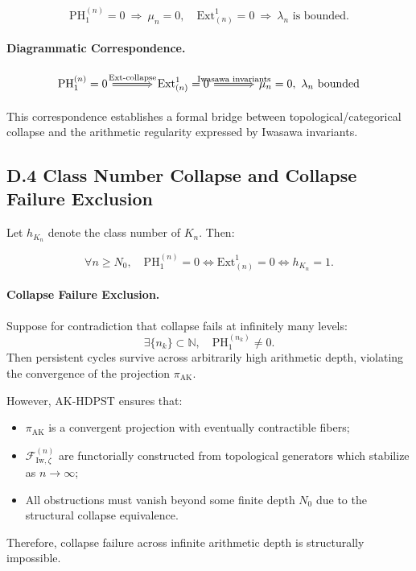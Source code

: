 \documentclass[11pt]{article}
\begin{document}
\[
\mathrm{PH}_1^{(n)} = 0 \ \Rightarrow \ \mu_n = 0, \quad
\mathrm{Ext}^1_{(n)} = 0 \ \Rightarrow \ \lambda_n \text{ is bounded}.
\]

\paragraph{Diagrammatic Correspondence.}
\[
\begin{tikzcd}[column sep=large]
\mathrm{PH}_1^{(n)} = 0 
\arrow[r, Rightarrow, "\text{Ext-collapse}"] 
& \mathrm{Ext}^1_{(n)} = 0 
\arrow[r, Rightarrow, "\text{Iwasawa invariants}"]
& \mu_n = 0, \ \lambda_n \text{ bounded}
\end{tikzcd}
\]

This correspondence establishes a formal bridge between topological/categorical collapse and the arithmetic regularity expressed by Iwasawa invariants.

\subsection*{D.4 Class Number Collapse and Collapse Failure Exclusion}

Let $h_{K_n}$ denote the class number of $K_n$. Then:

\[
\forall n \geq N_0, \quad \mathrm{PH}_1^{(n)} = 0 \iff \mathrm{Ext}^1_{(n)} = 0 \iff h_{K_n} = 1.
\]

\paragraph{Collapse Failure Exclusion.}
Suppose for contradiction that collapse fails at infinitely many levels:
\[
\exists \{n_k\} \subset \mathbb{N}, \quad \mathrm{PH}_1^{(n_k)} \neq 0.
\]
Then persistent cycles survive across arbitrarily high arithmetic depth, violating the convergence of the projection $\pi_{\mathrm{AK}}$.

However, AK-HDPST ensures that:
\begin{itemize}
    \item $\pi_{\mathrm{AK}}$ is a convergent projection with eventually contractible fibers;
    \item $\mathcal{F}_{\mathrm{Iw}, \zeta}^{(n)}$ are functorially constructed from topological generators which stabilize as $n \to \infty$;
    \item All obstructions must vanish beyond some finite depth $N_0$ due to the structural collapse equivalence.
\end{itemize}
Therefore, collapse failure across infinite arithmetic depth is structurally impossible.
\end{document}
